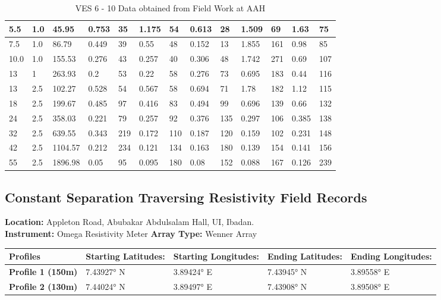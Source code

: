 \documentclass[12pt,a4paper]{report}
\begin{document}
\begin{table}[h!]
\begin{adjustbox}{max width=\textwidth}
\begin{tabular}{|p{2.5cm}|p{2.5cm}|p{2.5cm}|p{1.5cm}|p{1.8cm}|p{1.5cm}|p{1.8cm}|p{1.5cm}|p{1.8cm}|p{1.5cm}|p{1.8cm}|p{1.5cm}|p{1.8cm}|}
    5.5 & 1.0 & 45.95 & 0.753 & 35 & 1.175 & 54 & 0.613 & 28 & 1.509 & 69 & 1.63 & 75 \\ \hline
    7.5 & 1.0 & 86.79 & 0.449 & 39 & 0.55 & 48 & 0.152 & 13 & 1.855 & 161 & 0.98 & 85 \\ \hline
    10.0 & 1.0 & 155.53 & 0.276 & 43 & 0.257 & 40 & 0.306 & 48 & 1.742 & 271 & 0.69 & 107 \\ \hline
    13 & 1 & 263.93 & 0.2 & 53 & 0.22 & 58 & 0.276 & 73 & 0.695 & 183 & 0.44 & 116 \\ \hline
    13 & 2.5 & 102.27 & 0.528 & 54 & 0.567 & 58 & 0.694 & 71 & 1.78 & 182 & 1.12 & 115 \\ \hline
    18 & 2.5 & 199.67 & 0.485 & 97 & 0.416 & 83 & 0.494 & 99 & 0.696 & 139 & 0.66 & 132 \\ \hline
    24 & 2.5 & 358.03 & 0.221 & 79 & 0.257 & 92 & 0.376 & 135 & 0.297 & 106 & 0.385 & 138 \\ \hline
    32 & 2.5 & 639.55 & 0.343 & 219 & 0.172 & 110 & 0.187 & 120 & 0.159 & 102 & 0.231 & 148 \\ \hline
    42 & 2.5 & 1104.57 & 0.212 & 234 & 0.121 & 134 & 0.163 & 180 & 0.139 & 154 & 0.141 & 156 \\ \hline
    55 & 2.5 & 1896.98 & 0.05 & 95 & 0.095 & 180 & 0.08 & 152 & 0.088 & 167 & 0.126 & 239 \\ \hline
    \end{tabular}
    \end{adjustbox}
    \caption{VES 6 - 10 Data obtained from Field Work at AAH}
    \label{tab:aah_ves-6-10}
\end{table}


\subsection{Constant Separation Traversing Resistivity Field Records}
\textbf{Location:} {Appleton Road, Abubakar Abdulsalam Hall, UI, Ibadan.} \\
\textbf{Instrument:} {Omega Resistivity Meter}
\textbf{Array Type:} {Wenner Array }

\begin{table}[h!]
    \begin{adjustbox}{max width=\textwidth}
    \renewcommand{\arraystretch}{1.5}
    \begin{tabular}{|p{3.3cm}|p{2.5cm}|p{2.5cm}|p{2.5cm}|p{2.5cm}|}
    \hline
    \textbf{Profiles} &  
    \textbf{Starting Latitudes:} & 
    \textbf{Starting Longitudes:} & 
    \textbf{Ending Latitudes:} &
    \textbf{Ending Longitudes:} \\
    \hline
    \textbf{Profile 1 (150m)} & 7.43927° N & 3.89424° E & 7.43945° N & 3.89558° E  \\ \hline
    \textbf{Profile 2 (130m)} & 7.44024° N & 3.89497° E & 7.43908° N & 3.89508° E \\ \hline
    \end{tabular}
    \end{adjustbox}
    \label{tab:AAH CST Coordinates: 1-0}
\end{table}
\end{document}
